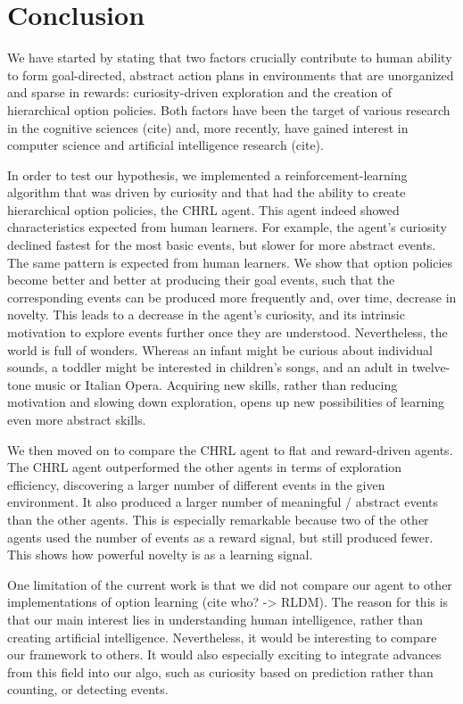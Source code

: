 \documentclass{article}
\begin{document}
\section{Conclusion}

We have started by stating that two factors crucially contribute to human ability to form goal-directed, abstract action plans in environments that are unorganized and sparse in rewards: curiosity-driven exploration and the creation of hierarchical option policies. Both factors have been the target of various research in the cognitive sciences (cite) and, more recently, have gained interest in computer science and artificial intelligence research (cite).

In order to test our hypothesis, we implemented a reinforcement-learning algorithm that was driven by curiosity and that had the ability to create hierarchical option policies, the CHRL agent. This agent indeed showed characteristics expected from human learners. For example, the agent's curiosity declined fastest for the most basic events, but slower for more abstract events. The same pattern is expected from human learners. We show that option policies become better and better at producing their goal events, such that the corresponding events can be produced more frequently and, over time, decrease in novelty. This leads to a decrease in the agent's curiosity, and its intrinsic motivation to explore events further once they are understood. Nevertheless, the world is full of wonders. Whereas an infant might be curious about individual sounds, a toddler might be interested in children's songs, and an adult in twelve-tone music or Italian Opera. Acquiring new skills, rather than reducing motivation and slowing down exploration, opens up new possibilities of learning even more abstract skills. 

We then moved on to compare the CHRL agent to flat and reward-driven agents. The CHRL agent outperformed the other agents in terms of exploration efficiency, discovering a larger number of different events in the given environment. It also produced a larger number of meaningful / abstract events than the other agents. This is especially remarkable because two of the other agents used the number of events as a reward signal, but still produced fewer. This shows how powerful novelty is as a learning signal.

One limitation of the current work is that we did not compare our agent to other implementations of option learning (cite who? -> RLDM). The reason for this is that our main interest lies in understanding human intelligence, rather than creating artificial intelligence. Nevertheless, it would be interesting to compare our framework to others. It would also especially exciting to integrate advances from this field into our algo, such as curiosity based on prediction rather than counting, or detecting events.
\end{document}
